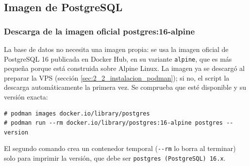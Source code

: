 \subsection{Imagen de PostgreSQL}\label{sec:5_1_carga_imagen}

\subsubsection{Descarga de la imagen oficial postgres:16-alpine}
La base de datos no necesita una imagen propia: se usa la imagen oficial de PostgreSQL 16 publicada en Docker Hub, en su variante \texttt{alpine}, que es más pequeña porque está construida sobre Alpine Linux. La imagen ya se descargó al preparar la VPS (sección \ref{sec:2_2_instalacion_podman}); si no, el script la descarga automáticamente la primera vez. Se comprueba que esté disponible y su versión exacta:
\begin{lstlisting}
# podman images docker.io/library/postgres
# podman run --rm docker.io/library/postgres:16-alpine postgres --version
\end{lstlisting}
El segundo comando crea un contenedor temporal (\texttt{-{}-rm} lo borra al terminar) solo para imprimir la versión, que debe ser \texttt{postgres (PostgreSQL) 16.x}.
